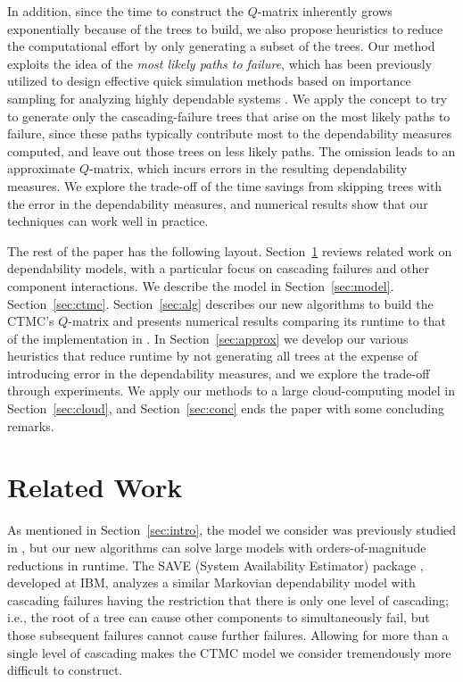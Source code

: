 \documentclass[12pt]{article}
\newcommand{\changed}[1]{#1}
\newcommand{\changed}[1]{\textcolor{red}{#1}}
\begin{document}
In addition, since the time to construct the $Q$-matrix inherently grows
exponentially %
\changed{because of the trees to build},
we also propose heuristics to reduce the computational effort by only
generating a subset of the trees.
\changed{Our method exploits the idea of the
\textit{most likely paths to failure},
which has been previously utilized to design effective quick simulation
methods based on importance sampling for analyzing highly dependable systems
\cite{GSHNG:1992,Naka:1996}.
We apply the concept to try to generate only the cascading-failure trees that
arise on the most likely paths to failure, since these paths typically
contribute most to the dependability measures computed, and leave out those
trees on less likely paths.} The omission leads to an approximate $Q$-matrix,
which incurs errors in the resulting dependability measures. We explore the
trade-off of the time savings from skipping trees with the error in the
dependability measures, %
\changed{and numerical results show
that our techniques can work well in practice.}

The rest of the paper has the following layout. Section~\ref{sec:prior}
reviews related work on dependability models, with a particular focus on
cascading failures and other component interactions. We describe the model in
Section~\ref{sec:model}. %
Section~\ref{sec:ctmc}. Section~\ref{sec:alg} describes our new algorithms to
build the CTMC's $Q$-matrix and presents numerical results comparing its
runtime to that of the implementation
in \cite{ING:2009}. In Section~\ref{sec:approx} we develop our various
heuristics that reduce runtime by not generating all trees at the expense of
introducing error in the dependability measures, and we explore the trade-off
through experiments. We apply our methods to a large cloud-computing model in
Section~\ref{sec:cloud}, and Section~\ref{sec:conc} ends the paper with some
concluding remarks.



\section{Related Work}
\label{sec:prior}

As mentioned in Section~\ref{sec:intro}, the model we consider was previously
studied in \cite{ING:2009}, but our new algorithms can solve large models with
orders-of-magnitude reductions in runtime. The SAVE (System Availability
Estimator) package \cite{BHLNS:1994}, developed at IBM, analyzes a similar
Markovian dependability model with cascading failures having the restriction
that there is only one level of cascading; i.e., the root of a tree can cause
other components to simultaneously fail, but those subsequent failures cannot
cause further failures. Allowing for more than a single level of cascading
makes the CTMC model we consider tremendously more difficult to construct.
\end{document}
